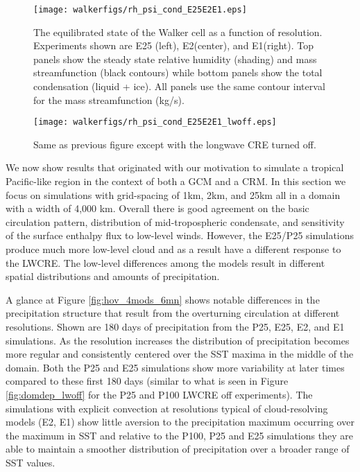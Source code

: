 \documentclass[draft]{agujournal2019}
\begin{document}
\begin{figure}
  \centering
      \texttt{[image: walkerfigs/rh\_psi\_cond\_E25E2E1.eps]}
      \caption{The equilibrated state of the Walker cell as a function of resolution.  
      Experiments shown are E25 (left), E2(center), and E1(right). Top panels show the 
      steady state relative humidity (shading) and mass streamfunction (black contours)
      while bottom panels show the total condensation (liquid + ice).  
      All panels use the same contour interval for the 
      mass streamfunction (kg/s).}
  \label{fig:rh_psi_P25E2E1}
\end{figure}

\begin{figure}
  \centering
      \texttt{[image: walkerfigs/rh\_psi\_cond\_E25E2E1\_lwoff.eps]}
          \caption{Same as previous figure except with the longwave CRE turned off.}
  \label{fig:rh_psi_P25E2E1_lwoff}
\end{figure}

We now show results that originated with our motivation to simulate a tropical Pacific-like region 
in the context of both a GCM and a CRM.  In this section we focus on simulations with grid-spacing of 
1km, 2km, and 25km all in a domain with a width of 4,000 km.  Overall there is good agreement on 
the basic circulation pattern, distribution of mid-tropospheric condensate, and sensitivity of the surface
enthalpy flux to low-level winds.  However, the E25/P25 simulations produce much more low-level cloud
and as a result have a different response to the LWCRE.  The low-level differences among the models
result in different spatial distributions and amounts of precipitation.  

A glance at Figure \ref{fig:hov_4mods_6mn} shows notable differences in the precipitation structure that result from the 
overturning circulation at different resolutions.  Shown are 180 days of precipitation from the P25, E25, E2, and 
E1 simulations.  As the resolution increases the distribution of precipitation becomes more regular and consistently 
centered over the SST maxima in the middle of the domain.  Both the P25 and E25 simulations show more 
variability at later times compared to these first 180 days (similar to what is seen in Figure \ref{fig:domdep_lwoff} 
for the P25 and P100 LWCRE off experiments).  The simulations with explicit convection at resolutions 
typical of cloud-resolving models (E2, E1) show little aversion to the precipitation maximum occurring over 
the maximum in SST and relative to the P100, P25 and E25 simulations they are able to maintain a 
smoother distribution of  precipitation over a broader range of SST values.    
\end{document}
